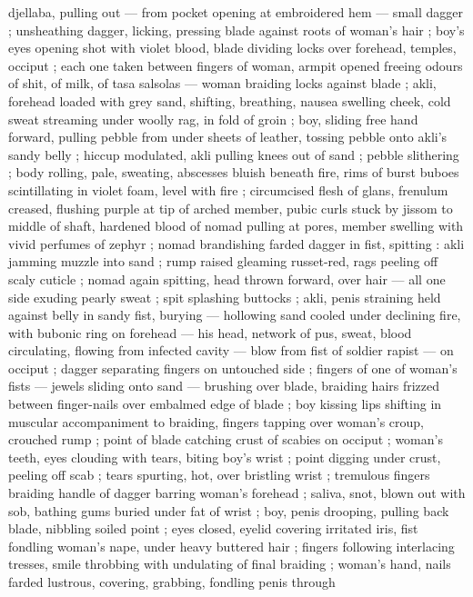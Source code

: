 djellaba, pulling out --- from pocket opening at embroidered hem ---
small dagger ; unsheathing dagger, licking, pressing blade against
roots of woman's hair ; boy's eyes opening shot with violet blood,
blade dividing locks over forehead, temples, occiput ; each one taken
between fingers of woman, armpit opened freeing odours of shit, of
milk, of tasa salsolas --- woman braiding locks against blade ; akli,
forehead loaded with grey sand, shifting, breathing, nausea swelling
cheek, cold sweat streaming under woolly rag, in fold of groin ; boy,
sliding free hand forward, pulling pebble from under sheets of
leather, tossing pebble onto akli's sandy belly ; hiccup modulated,
akli pulling knees out of sand ; pebble slithering ; body rolling, pale,
sweating, abscesses bluish beneath fire, rims of burst buboes
scintillating in violet foam, level with fire ; circumcised flesh of glans,
frenulum creased, flushing purple at tip of arched member, pubic
curls stuck by jissom to middle of shaft, hardened blood of nomad
pulling at pores, member swelling with vivid perfumes of zephyr ;
nomad brandishing farded dagger in fist, spitting : akli jamming
muzzle into sand ; rump raised gleaming russet-red, rags peeling off
scaly cuticle ; nomad again spitting, head thrown forward, over hair
--- all one side exuding pearly sweat ; spit splashing buttocks ; akli,
penis straining held against belly in sandy fist, burying --- hollowing
sand cooled under declining fire, with bubonic ring on forehead ---
his head, network of pus, sweat, blood circulating, flowing from
infected cavity --- blow from fist of soldier rapist --- on occiput ;
dagger separating fingers on untouched side ; fingers of one of
woman's fists --- jewels sliding onto sand --- brushing over blade,
braiding hairs frizzed between finger-nails over embalmed edge of
blade ; boy kissing lips shifting in muscular accompaniment to
braiding, fingers tapping over woman's croup, crouched rump ; point
of blade catching crust of scabies on occiput ; woman's teeth, eyes
clouding with tears, biting boy's wrist ; point digging under crust,
peeling off scab ; tears spurting, hot, over bristling wrist ; tremulous
fingers braiding handle of dagger barring woman's forehead ; saliva,
snot, blown out with sob, bathing gums buried under fat of wrist ;
boy, penis drooping, pulling back blade, nibbling soiled point ; eyes
closed, eyelid covering irritated iris, fist fondling woman's nape,
under heavy buttered hair ; fingers following interlacing tresses,
smile throbbing with undulating of final braiding ; woman's hand,
nails farded lustrous, covering, grabbing, fondling penis through
